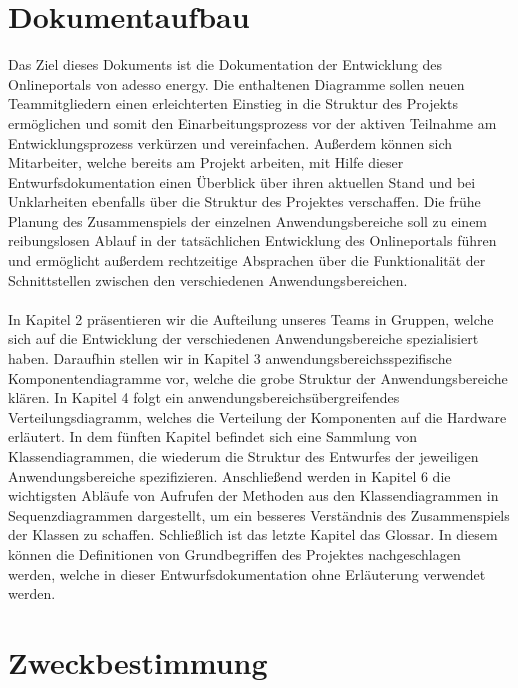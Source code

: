 \section{Dokumentaufbau}\label{sec:dokumentaufbau}

Das Ziel dieses Dokuments ist die Dokumentation der Entwicklung des Onlineportals von adesso energy. 
Die enthaltenen Diagramme sollen neuen Teammitgliedern einen erleichterten Einstieg in die Struktur des Projekts ermöglichen 
und somit den Einarbeitungsprozess vor der aktiven Teilnahme am Entwicklungsprozess verkürzen und vereinfachen.  
Außerdem können sich Mitarbeiter, welche bereits am Projekt arbeiten, mit Hilfe dieser Entwurfsdokumentation einen Überblick über 
ihren aktuellen Stand und bei Unklarheiten ebenfalls über die Struktur des Projektes verschaffen.
Die frühe Planung des Zusammenspiels der einzelnen Anwendungsbereiche soll zu einem reibungslosen Ablauf 
in der tatsächlichen Entwicklung des Onlineportals führen und ermöglicht außerdem rechtzeitige Absprachen über die Funktionalität 
der Schnittstellen zwischen den verschiedenen Anwendungsbereichen.\\\\
In Kapitel 2 präsentieren wir die Aufteilung unseres Teams in Gruppen, welche sich auf die Entwicklung 
der verschiedenen Anwendungsbereiche spezialisiert haben. Daraufhin stellen wir in Kapitel 3 anwendungsbereichsspezifische 
Komponentendiagramme vor, welche die grobe Struktur der Anwendungsbereiche klären.
In Kapitel 4 folgt ein anwendungsbereichsübergreifendes Verteilungsdiagramm, welches die Verteilung der Komponenten auf die Hardware erläutert. 
In dem fünften Kapitel befindet sich eine Sammlung von Klassendiagrammen, die wiederum die Struktur des Entwurfes 
der jeweiligen Anwendungsbereiche spezifizieren. Anschließend werden in Kapitel 6 die wichtigsten Abläufe von Aufrufen 
der Methoden aus den Klassendiagrammen in Sequenzdiagrammen dargestellt, um ein besseres Verständnis 
des Zusammenspiels der Klassen zu schaffen. Schließlich ist das letzte Kapitel das Glossar. 
In diesem können die Definitionen von Grundbegriffen des Projektes nachgeschlagen werden, welche in 
dieser Entwurfsdokumentation ohne Erläuterung verwendet werden.

\section{Zweckbestimmung}\label{sec:zweckbestimmung}

